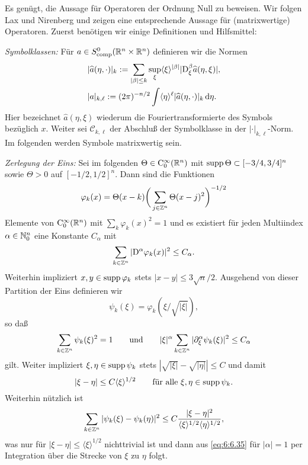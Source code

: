 Es genügt, die Aussage für Operatoren der Ordnung Null zu beweisen. Wir folgen Lax und Nirenberg \cite{Lax:1966} und zeigen eine entsprechende Aussage für (matrixwertige) Operatoren. Zuerst benötigen wir einige Definitionen und Hilfsmittel:

\medskip\noindent
{\em Symbolklassen:} Für $ a\in S^0_{\rm comp}(\mathbb R^n\times\mathbb R^n)$ definieren wir die Normen
\begin{equation}
\begin{split}&	\vert \widehat{a}(\eta,\cdot)\vert_k := \sum\limits_{\vert \beta\vert \le k} \sup\limits_{\xi} \langle \xi\rangle^{\vert \beta\vert}\vert\mathrm D_\xi^\beta  \widehat{a}(\eta,\xi)\vert,\\
&   | a|_{k,\ell} := (2\pi)^{-n/2} \int \langle\eta\rangle^\ell   \vert \widehat{a}(\eta,\cdot)\vert_k \,\mathrm d \eta.
\end{split}
\end{equation}
Hier bezeichnet $\widehat a(\eta,\xi)$ wiederum die Fouriertransformierte des Symbols bezüglich $x$. Weiter sei $\mathcal{C}_{k,\ell}$ der Abschluß der Symbolklasse in der $ |\cdot |_{k,\ell}$-Norm.
Im folgenden werden Symbole matrixwertig sein.

\medskip\noindent
{\em Zerlegung der Eins:} Sei im folgenden $\Theta\in\mathrm C_0^\infty(\mathbb R^n)$ mit $\operatorname{supp}\Theta\subset [-3/4,3/4]^n$ sowie $\Theta>0$ auf $[-1/2,1/2]^n$. Dann sind die Funktionen
\begin{equation}
\varphi_k(x) = \Theta(x-k) \bigg(\sum_{j\in\mathbb Z^n} \Theta(x-j)^2\bigg)^{-1/2}
\end{equation}
Elemente von $\mathrm C_0^\infty(\mathbb R^n)$ mit $\sum_{k} \varphi_k(x)^2=1$ und es existiert für jeden Multiindex $\alpha\in\mathbb N_0^n$ eine Konstante $C_\alpha$ mit
\begin{equation}
    \sum_{k\in\mathbb Z^n} | \mathrm D^\alpha \varphi_k(x)|^2 \le C_\alpha.
\end{equation}
Weiterhin impliziert $x,y\in\operatorname{supp}\varphi_k$ stets $|x-y|\le 3\sqrt n/2$. Ausgehend von dieser Partition der Eins definieren wir
\begin{equation}
    \psi_k(\xi)= \varphi_k(\xi / \sqrt{|\xi|}), 
\end{equation}
so daß
\begin{equation}\label{eq:6:6.35} 
    \sum_{k\in\mathbb Z^n} \psi_k(\xi)^2 = 1\qquad\text{und}\qquad |\xi|^\alpha \sum_{k\in\mathbb Z^n} |\partial_\xi^\alpha \psi_k(\xi)|^2 \le C_\alpha
\end{equation}
gilt. Weiter impliziert $\xi,\eta\in\operatorname{supp}\psi_k$ stets $|\sqrt{|\xi|}-\sqrt{|\eta|}|\le C$ und damit 
\begin{equation}\label{eq:6:6.36}
 |\xi-\eta|\le C \langle\xi\rangle^{1/2} \qquad\text{für alle $\xi,\eta\in\operatorname{supp}\psi_k$}.
\end{equation}
Weiterhin nützlich ist
\begin{equation}\label{eq:6:6.37}
  \sum_{k\in\mathbb Z^n} |\psi_k(\xi)-\psi_k(\eta)|^2 \le C \frac{|\xi-\eta|^2}{ \langle\xi\rangle^{1/2} \langle\eta\rangle^{1/2}},
\end{equation} 
was nur für $|\xi-\eta|\le \langle\xi\rangle^{1/2}$ nichttrivial ist und dann aus \eqref{eq:6:6.35} für $|\alpha|=1$ per Integration über die Strecke von $\xi$ zu $\eta$ folgt.

